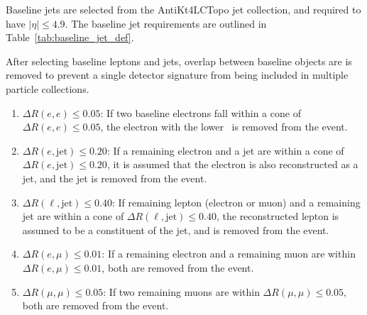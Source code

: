 Baseline jets are selected from the AntiKt4LCTopo jet collection, and required
to have $|\eta| \leq 4.9$.
The baseline jet requirements are outlined in Table~\ref{tab:baseline_jet_def}.

\begin{table}[ht]
    \caption{Baseline jet requirements.}
    \label{tab:baseline_jet_def}
\end{table}

After selecting baseline leptons and jets, overlap between baseline objects are
is removed to prevent a single detector signature from being included in
multiple particle collections. 

\begin{enumerate}
  \item $\Delta R(e,e) \le 0.05$: If two baseline electrons fall
    within a cone of $\Delta R(e,e) \le 0.05$, the electron with the
    lower \ET\ is removed from the event.
  \item $\Delta R(e,\mathrm{jet}) \le 0.20$: If a remaining electron and a jet
    are within a cone of $\Delta R(e,\mathrm{jet}) \le 0.20$, it is
    assumed that the electron is also reconstructed as a jet, and the
    jet is removed from the event.
  \item $\Delta R(\ell,\mathrm{jet}) \le 0.40$: If remaining lepton (electron
    or muon) and a remaining jet are within a cone of
    $\Delta R(\ell,\mathrm{jet}) \le 0.40$, the reconstructed lepton is assumed
    to be a constituent of the jet, and is removed from the event.
  \item $\Delta R(e,\mu) \le 0.01$: If a remaining electron and a remaining muon
    are within $\Delta R(e,\mu) \le 0.01$, both are removed from the event.
  \item $\Delta R(\mu,\mu) \le 0.05$: If two remaining muons are within
    $\Delta R(\mu,\mu) \le 0.05$, both are removed from the event.
\end{enumerate}

